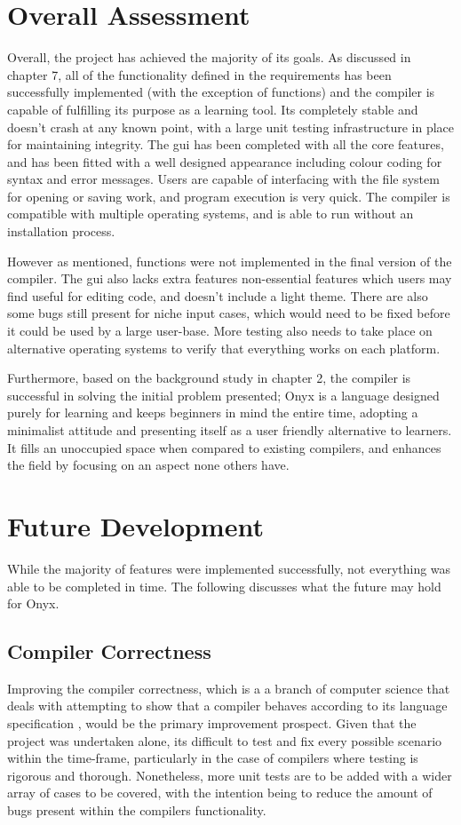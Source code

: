 \documentclass[
]{report}
\begin{document}
\section{Overall Assessment}
Overall, the project has achieved the majority of its goals. As
discussed in chapter 7, all of the functionality defined in the
requirements has been successfully implemented (with the exception of
functions) and the compiler is capable of fulfilling its purpose as a
learning tool. Its completely stable and doesn't crash at any known
point, with a large unit testing infrastructure in place for maintaining
integrity. The \acrshort{gui} has been completed with all the core features, and
has been fitted with a well designed appearance including colour coding
for syntax and error messages. Users are capable of interfacing with the
file system for opening or saving work, and program execution is very
quick. The compiler is compatible with multiple operating systems, and
is able to run without an installation process.

However as mentioned, functions were not implemented in the final
version of the compiler. The \acrshort{gui} also lacks extra features non-essential
features which users may find useful for editing code, and doesn't
include a light theme. There are also some bugs still present for niche
input cases, which would need to be fixed before it could be used by a
large user-base. More testing also needs to take place on alternative
operating systems to verify that everything works on each platform.

Furthermore, based on the background study in chapter 2, the compiler is
successful in solving the initial problem presented; Onyx is a language
designed purely for learning and keeps beginners in mind the entire
time, adopting a minimalist attitude and presenting itself as a user
friendly alternative to learners. It fills an unoccupied space when
compared to existing compilers, and enhances the field by focusing on an
aspect none others have.

\section{Future Development}
While the majority of features were implemented successfully, not
everything was able to be completed in time. The following discusses
what the future may hold for Onyx.

\subsection{Compiler Correctness}
Improving the compiler correctness, which is a a branch of computer
science that deals with attempting to show that a compiler behaves
according to its language specification \cite{correctness-wiki}, would be the primary
improvement prospect. Given that the project was undertaken alone, its
difficult to test and fix every possible scenario within the time-frame,
particularly in the case of compilers where testing is rigorous and
thorough. Nonetheless, more unit tests are to be added with a wider
array of cases to be covered, with the intention being to reduce the
amount of bugs present within the compilers functionality.
\end{document}
